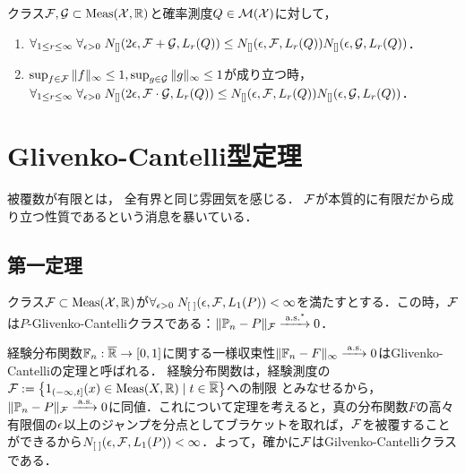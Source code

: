 \documentclass[uplatex,dvipdfmx]{jsreport}
\begin{document}
\begin{lemma}
    クラス$\mathcal{F},\mathcal{G}\subset\mathrm{Meas}(\mathcal{X},\mathbb{R})$と確率測度$Q\in\mathcal{M}(\mathcal{X})$に対して，
    \begin{enumerate}
        \item $\forall_{1\le r\le\infty}\;\forall_{\epsilon>0}\;N_{[]}(2\epsilon,\mathcal{F}+\mathcal{G},L_r(Q))\le N_{[]}(\epsilon,\mathcal{F},L_r(Q))N_{[]}(\epsilon,\mathcal{G},L_r(Q))$．
        \item $\sup_{f\in\mathcal{F}}\|f\|_\infty\le 1,\sup_{g\in\mathcal{G}}\|g\|_\infty\le 1$が成り立つ時，$\forall_{1\le r\le\infty}\;\forall_{\epsilon>0}\;N_{[]}(2\epsilon,\mathcal{F}\cdot\mathcal{G},L_r(Q))\le N_{[]}(\epsilon,\mathcal{F},L_r(Q))N_{[]}(\epsilon,\mathcal{G},L_r(Q))$．
    \end{enumerate}
\end{lemma}

\section{Glivenko-Cantelli型定理}

\begin{tcolorbox}[colframe=ForestGreen, colback=ForestGreen!10!white,breakable,colbacktitle=ForestGreen!40!white,coltitle=black,fonttitle=\bfseries\sffamily,
title=]
    被覆数が有限とは，
    全有界と同じ雰囲気を感じる．
    $\mathcal{F}$が本質的に有限だから成り立つ性質であるという消息を暴いている．
\end{tcolorbox}

\subsection{第一定理}

\begin{theorem}\label{thm-Glivenko-Cantelli-1}
    クラス$\mathcal{F}\subset\mathrm{Meas}(\mathcal{X},\mathbb{R})$が$\forall_{\epsilon>0}\;N_{[\;]}(\epsilon,\mathcal{F},L_1(P))<\infty$を満たすとする．この時，$\mathcal{F}$は$P$-Glivenko-Cantelliクラスである：$\|\mathbb{P}_n-P\|_{\mathcal{F}}\xrightarrow{\;\mathrm{a.s.}^*}0$．
\end{theorem}

\begin{example}
    経験分布関数$\mathbb{F}_n:\overline{\mathbb{R}}\to[0,1]$に関する一様収束性$\|\mathbb{F}_n-F\|_\infty\xrightarrow{\;\mathrm{a.s.}}0$はGlivenko-Cantelliの定理と呼ばれる．
    経験分布関数は，経験測度の$\mathcal{F}:=\left\{1_{(-\infty,t]}(x)\in\mathrm{Meas}(X,\mathbb{R})\mid t\in\overline{\mathbb{R}}\right\}$への制限
    とみなせるから，$\|\mathbb{P}_n-P\|_{\mathcal{F}}\xrightarrow{\;\mathrm{a.s.}}0$に同値．これについて定理を考えると，真の分布関数$F$の高々有限個の$\epsilon$以上のジャンプを分点としてブラケットを取れば，$\mathcal{F}$を被覆することができるから$N_{[\;]}(\epsilon,\mathcal{F},L_1(P))<\infty$．よって，確かに$\mathcal{F}$はGilvenko-Cantelliクラスである．
\end{example}
\end{document}

